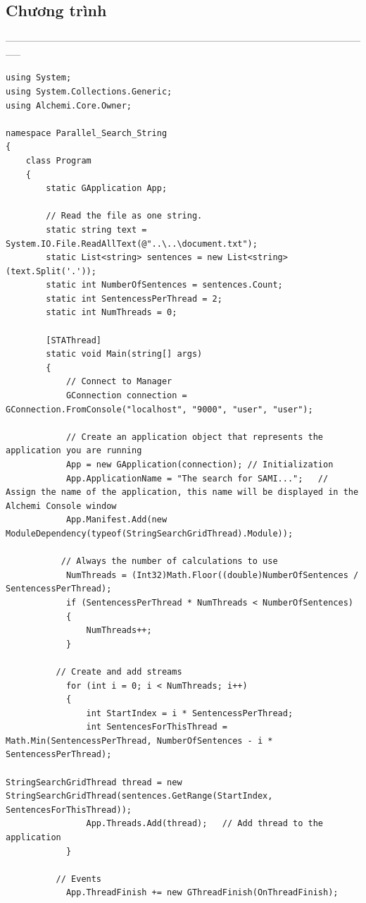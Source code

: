 \documentclass[12pt,a4paper]{article}
\begin{document}
\subsection{Chương trình}
-----------------------------------------------------------------------------------------------------------------
\begin{lstlisting}
using System;
using System.Collections.Generic;
using Alchemi.Core.Owner;

namespace Parallel_Search_String
{
    class Program
    {
        static GApplication App;

        // Read the file as one string.
        static string text = System.IO.File.ReadAllText(@"..\..\document.txt");
        static List<string> sentences = new List<string>(text.Split('.'));
        static int NumberOfSentences = sentences.Count;
        static int SentencessPerThread = 2;
        static int NumThreads = 0;
            
        [STAThread]
        static void Main(string[] args)
        {
  			// Connect to Manager
            GConnection connection = GConnection.FromConsole("localhost", "9000", "user", "user");

       		// Create an application object that represents the application you are running
            App = new GApplication(connection); // Initialization
            App.ApplicationName = "The search for SAMI...";   // Assign the name of the application, this name will be displayed in the Alchemi Console window
            App.Manifest.Add(new ModuleDependency(typeof(StringSearchGridThread).Module));   

           // Always the number of calculations to use
            NumThreads = (Int32)Math.Floor((double)NumberOfSentences / SentencessPerThread);
            if (SentencessPerThread * NumThreads < NumberOfSentences)
            {
                NumThreads++;
            }

          // Create and add streams
            for (int i = 0; i < NumThreads; i++)
            {
                int StartIndex = i * SentencessPerThread;
                int SentencesForThisThread = Math.Min(SentencessPerThread, NumberOfSentences - i * SentencessPerThread);

StringSearchGridThread thread = new StringSearchGridThread(sentences.GetRange(StartIndex, SentencesForThisThread)); 
                App.Threads.Add(thread);   // Add thread to the application
            }

          // Events
            App.ThreadFinish += new GThreadFinish(OnThreadFinish);


\end{lstlisting}
\end{document}
